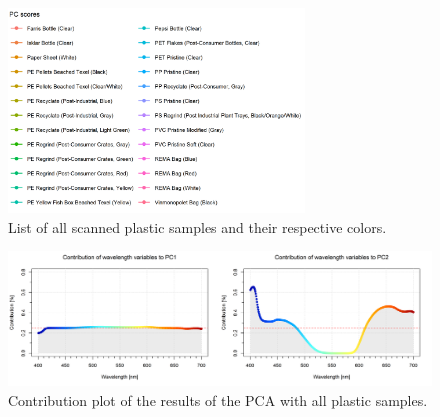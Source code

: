 \begin{figure}[H]
   \centering
    \includegraphics[width=0.7\textwidth]{Images/results/PCA_plastics_full_list.png}
  \caption{List of all scanned plastic samples and their respective colors.}
  \label{fig:PCA_plastics_full_list}
\end{figure}

\begin{figure}[H]
    \centering
    \includegraphics[width=1\textwidth]{Images/results/PCA_plastics_full_doub_cont.png}
    \caption{Contribution plot of the results of the PCA with all plastic samples.}
    \label{fig:PCA_plastics_full_doub_cont}
\end{figure}

